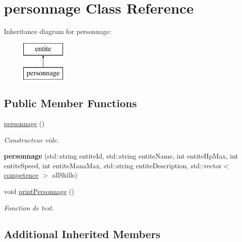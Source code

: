 \hypertarget{classpersonnage}{}\section{personnage Class Reference}
\label{classpersonnage}
Inheritance diagram for personnage\+:\begin{figure}[H]
\begin{center}
\leavevmode
\includegraphics[height=2.000000cm]{classpersonnage}
\end{center}
\end{figure}
\subsection*{Public Member Functions}
\begin{DoxyCompactItemize}
\item 
\hyperlink{classpersonnage_acd9ca516f8c5c110687e5167dab8db59}{personnage} ()
\begin{DoxyCompactList}\small\item\em Constructeur vide. \end{DoxyCompactList}\item 
\mbox{\label{classpersonnage_adec7b6f38637e7d176e054b68b0fcb23}} 
{\bfseries personnage} (std\+::string entite\+Id, std\+::string entite\+Name, int entite\+Hp\+Max, int entite\+Speed, int entite\+Mana\+Max, std\+::string entite\+Description, std\+::vector$<$ \hyperlink{classcompetence}{competence} $>$ all\+Skills)
\item 
\mbox{\label{classpersonnage_a173f1b07d9098a96fd189ede2e7dad59}} 
void \hyperlink{classpersonnage_a173f1b07d9098a96fd189ede2e7dad59}{print\+Personnage} ()
\begin{DoxyCompactList}\small\item\em Fonction de test. \end{DoxyCompactList}\end{DoxyCompactItemize}
\subsection*{Additional Inherited Members}


